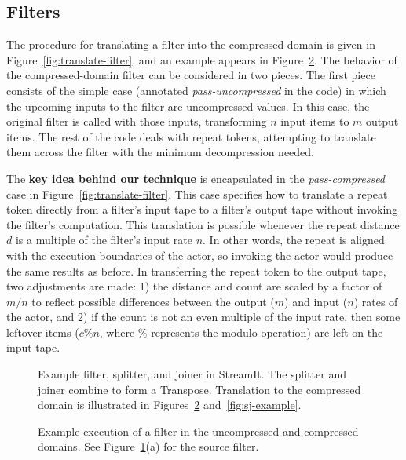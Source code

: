 \subsection*{Filters}

The procedure for translating a filter into the compressed domain is
given in Figure~\ref{fig:translate-filter}, and an example appears in
Figure~\ref{fig:filter-example}.  The behavior of the
compressed-domain filter can be considered in two pieces.  The first
piece consists of the simple case (annotated {\it pass-uncompressed}
in the code) in which the upcoming inputs to the filter are
uncompressed values.  In this case, the original filter is called with
those inputs, transforming $n$ input items to $m$ output items.  The
rest of the code deals with repeat tokens, attempting to translate
them across the filter with the minimum decompression needed.

The {\bf key idea behind our technique} is encapsulated in the {\it
  pass-compressed} case in Figure~\ref{fig:translate-filter}.  This
case specifies how to translate a repeat token directly from a
filter's input tape to a filter's output tape without invoking the
filter's computation.  This translation is possible whenever the
repeat distance $d$ is a multiple of the filter's input rate $n$.  In
other words, the repeat is aligned with the execution boundaries of
the actor, so invoking the actor would produce the same results as
before.  In transferring the repeat token to the output tape, two
adjustments are made: 1) the distance and count are scaled by a factor
of $m/n$ to reflect possible differences between the output ($m$) and
input ($n$) rates of the actor, and 2) if the count is not an even
multiple of the input rate, then some leftover items ($c\%n$, where
$\%$ represents the modulo operation) are left on the input tape.

\begin{figure}[t!]
\caption[Example StreamIt code to be mapped into the compressed
  domain.]{Example filter, splitter, and joiner in StreamIt.  The
  splitter and joiner combine to form a Transpose. Translation to the
  compressed domain is illustrated in Figures~\ref{fig:filter-example}
  and~\ref{fig:sj-example}.\protect\label{fig:streamit-example}}
\end{figure}

\begin{figure}[t!]
\vspace{-18pt}
\vspace{-30pt} %
\caption[Example execution of a filter in the uncompressed and
  compressed domains.]{Example execution of a filter in the
  uncompressed and compressed domains.  See
  Figure~\ref{fig:streamit-example}(a) for the source
  filter.\protect\label{fig:filter-example}}
\vspace{12pt}
\end{figure}

